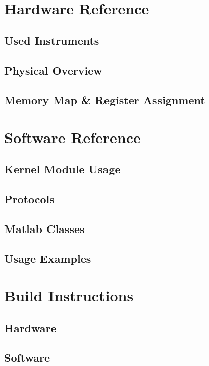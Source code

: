 \documentclass[12pt,a4paper,parskip=full,abstract=true,BCOR=10mm,twoside,open=right]{scrreprt}
\begin{document}
\begin{appendix}
    \chapter{Hardware Reference}
    \section{Used Instruments}
    \label{sec:instruments}
    \section{Physical Overview}
    \section{Memory Map \& Register Assignment}
    \chapter{Software Reference}
    \section{Kernel Module Usage}
    \section{Protocols}
    \section{Matlab Classes}
    \section{Usage Examples}
    \chapter{Build Instructions}
    \section{Hardware}
    \section{Software}

    \printglossary[type=\acronymtype]

    \listoffigures

    
    


\end{appendix}
\end{document}
